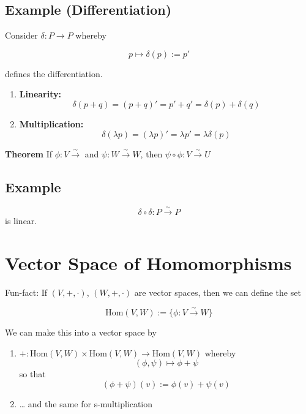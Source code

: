 \documentclass[
  letterpaper,
  DIV=11,
  numbers=noendperiod,
  oneside]{scrreprt}
\providecommand{\tightlist}{%
  \setlength{\itemsep}{0pt}\setlength{\parskip}{0pt}}\usepackage{longtable,booktabs,array}
\begin{document}
\hypertarget{example-differentiation}{%
\subsection{Example (Differentiation)}\label{example-differentiation}}

Consider \(\delta:P \to P\) whereby

\[ p\mapsto \delta(p) := p'\]

defines the differentiation.

\begin{enumerate}
\def\labelenumi{\arabic{enumi}.}
\tightlist
\item
  \textbf{Linearity:}
  \[\delta(p+q) = (p+q)' = p'+q' = \delta(p) + \delta(q)\]
\item
  \textbf{Multiplication:}
  \[\delta(\lambda p) = (\lambda p)' = \lambda p' = \lambda \delta(p)\]
\end{enumerate}

\textbf{Theorem} If \(\phi:V \xrightarrow{\sim}\) and
\(\psi:W \xrightarrow{\sim} W\), then
\(\psi \circ \phi : V \xrightarrow{\sim} U\)

\hypertarget{example-1}{%
\subsection{Example}\label{example-1}}

\[\delta \circ \delta: P \xrightarrow{\sim} P\] is linear.

\hypertarget{vector-space-of-homomorphisms}{%
\section{Vector Space of
Homomorphisms}\label{vector-space-of-homomorphisms}}

Fun-fact: If \((V, +, \cdot)\), \((W, +, \cdot)\) are vector spaces,
then we can define the set

\[\text{Hom}(V,W) := \{ \phi: V \xrightarrow{\sim} W\}\]

We can make this into a vector space by

\begin{enumerate}
\def\labelenumi{\arabic{enumi}.}
\tightlist
\item
  \(+: \text{Hom}(V,W) \times \text{Hom}(V,W) \to \text{Hom}(V,W)\)
  whereby \[ (\phi, \psi) \mapsto \phi + \psi \] so that
  \[(\phi + \psi)(v) := \phi(v) + \psi(v) \]
\item
  \ldots{} and the same for s-multiplication
\end{enumerate}
\end{document}
